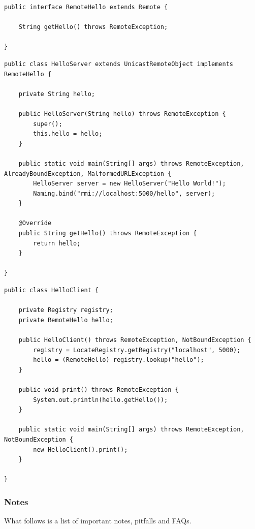 \documentclass[a4paper]{article}
\begin{document}
\begin{lstlisting}
public interface RemoteHello extends Remote {

    String getHello() throws RemoteException;

}
\end{lstlisting}

\begin{lstlisting}
public class HelloServer extends UnicastRemoteObject implements RemoteHello {

    private String hello;

    public HelloServer(String hello) throws RemoteException {
        super();
        this.hello = hello;
    }

    public static void main(String[] args) throws RemoteException, AlreadyBoundException, MalformedURLException {
        HelloServer server = new HelloServer("Hello World!");
        Naming.bind("rmi://localhost:5000/hello", server);
    }

    @Override
    public String getHello() throws RemoteException {
        return hello;
    }

}
\end{lstlisting}

\begin{lstlisting}
public class HelloClient {

    private Registry registry;
    private RemoteHello hello;

    public HelloClient() throws RemoteException, NotBoundException {
        registry = LocateRegistry.getRegistry("localhost", 5000);
        hello = (RemoteHello) registry.lookup("hello");
    }

    public void print() throws RemoteException {
        System.out.println(hello.getHello());
    }

    public static void main(String[] args) throws RemoteException, NotBoundException {
        new HelloClient().print();
    }

}
\end{lstlisting}

\subsubsection{Notes}

What follows is a list of important notes, pitfalls and FAQs.
\end{document}
